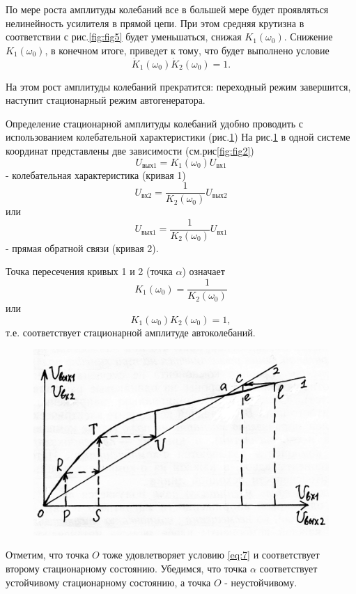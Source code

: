 По мере роста амплитуды колебаний все в большей мере будет проявляться нелинейность усилителя в прямой цепи. При этом средняя крутизна в соответствии с рис.\ref{fig:fig5} будет уменьшаться, снижая $K_1(\omega_0)$. Снижение $K_1(\omega_0)$, в конечном итоге, приведет к тому, что будет выполнено условие
\begin{equation*}
\dot{K}_1(\omega_0)\dot{K}_2(\omega_0)=1.
\end{equation*}

На этом рост амплитуды колебаний прекратится: переходный режим завершится, наступит стационарный режим автогенератора.

Определение стационарной амплитуды колебаний удобно проводить с использованием колебательной характеристики (рис.\ref{fig:fig8})
На рис.\ref{fig:fig8} в одной системе координат представлены две зависимости (см.рис\ref{fig:fig2}) 
\begin{equation*}
U_{\text{вых}1}=K_1(\omega_0)U_{\text{вх}1}
\end{equation*}
- колебательная характеристика (кривая 1)
\begin{equation*}
U_{\text{вх}2}=\frac{1}{K_2(\omega_0)}U_{\text{вых}2}
\end{equation*}
или
\begin{equation*}
U_{\text{вых}1}=\frac{1}{K_2(\omega_0)}U_{\text{вх}1}
\end{equation*}
- прямая обратной связи (кривая 2).

Точка пересечения кривых 1 и 2 (точка $\alpha$) означает
\begin{equation*}
K_1(\omega_0)=\frac{1}{K_2(\omega_0)}
\end{equation*}
или
\begin{equation}
K_1(\omega_0)K_2(\omega_0)=1,
\label{eq:7}
\end{equation}
т.е. соответствует стационарной амплитуде автоколебаний.

\begin{figure}[h]
	\centering
	\includegraphics[width=0.4\linewidth]{circuit/fig8}
	\caption{}
	\label{fig:fig8}
\end{figure}

Отметим, что точка $O$ тоже удовлетворяет условию \eqref{eq:7} и соответствует второму стационарному состоянию. Убедимся, что точка $\alpha$ соответствует устойчивому стационарному состоянию, а точка $O$ - неустойчивому.

